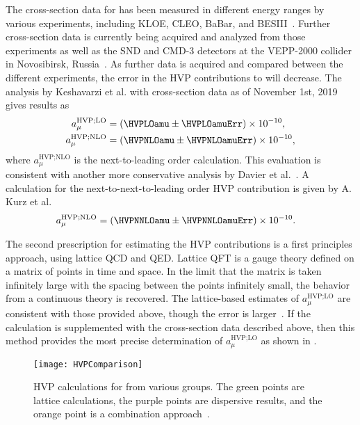 The cross-section data for  has been measured in different energy ranges by various experiments, including KLOE, CLEO, BaBar, and BESIII~\cite{KLOE,CLEO,BaBar,BESIII}. Further cross-section data is currently being acquired and analyzed from those experiments as well as the SND and CMD-3 detectors at the VEPP-2000 collider in Novosibirsk, Russia~\cite{SND,CMD3}. As further data is acquired and compared between the different experiments, the error in the HVP contributions to \amu will decrease. The analysis by Keshavarzi et al. with cross-section data as of November 1st, 2019 gives results as~\cite{Keshavarzi:2018mgv,Keshavarzi:2019abf}
		\begin{equation}
		\begin{aligned}
            a_{\mu}^{\text{HVP;LO}} &= (\HVPLOamu \pm \HVPLOamuErr) \times 10^{-10}, \\
            a_{\mu}^{\text{HVP;NLO}} &= (\HVPNLOamu \pm \HVPNLOamuErr) \times 10^{-10}, 
		\end{aligned}
		\end{equation}
where $a_{\mu}^{\text{HVP;NLO}}$ is the next-to-leading order calculation. This evaluation is consistent with another more conservative analysis by Davier et al.~\cite{HVP2,Davier:2019can}. A calculation for the next-to-next-to-leading order HVP contribution is given by A. Kurz et al.~\cite{Kurz:2014wya}
		\begin{equation}
		\begin{aligned}
            a_{\mu}^{\text{HVP;NLO}} &= (\HVPNNLOamu \pm \HVPNNLOamuErr) \times 10^{-10}. 
		\end{aligned}
		\end{equation}



The second prescription for estimating the HVP contributions is a first principles approach, using lattice QCD and QED. Lattice QFT is a gauge theory defined on a matrix of points in time and space. In the limit that the matrix is taken infinitely large with the spacing between the points infinitely small, the behavior from a continuous theory is recovered. The lattice-based estimates of $a_{\mu}^{\text{HVP;LO}}$ are consistent with those provided above, though the error is larger~\cite{Lattice}. If the calculation is supplemented with the cross-section data described above, then this method provides the most precise determination of $a_{\mu}^{\text{HVP;LO}}$ as shown in . 

\begin{figure}
    \centering
    \texttt{[image: HVPComparison]}
    \caption[HVP calculations for \amu from various groups]{HVP calculations for \amu from various groups. The green points are lattice calculations, the purple points are dispersive results, and the orange point is a combination approach~\cite{Lattice}.}
    \label{fig:HVPComparison}
\end{figure}


